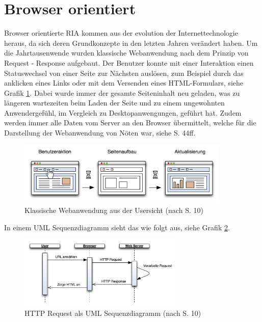  \section{Browser orientiert}
  
  Browser orientierte \ac{RIA} kommen aus der evolution der Internettechnologie
  heraus, da sich deren Grundkonzepte in den letzten Jahren verändert haben. Um
  die Jahrtausenwende wurden klassische Webanwendung nach dem Prinzip von
  Request - Response aufgebaut. Der Benutzer konnte mit einer Interaktion einen
  Statuswechsel von einer Seite zur Nächsten auslösen, zum Beispiel durch das
  anklicken eines Links oder mit dem Versenden eines HTML-Formulars, siehe
  Grafik \ref{img:classicPageReload}. Dabei wurde immer der gesamte
  Seiteninhalt neu geladen, was zu längeren wartezeiten beim Laden der Seite
  und zu einem ungewohnten Anwendergefühl, im Vergleich zu Desktopanwengungen,
  geführt hat. Zudem werden immer alle Daten vom Server an den Browser
  übermittelt, welche für die Darstellung der Webanwendung von Nöten war, siehe
  \cite{AjaxInAction} S. 44ff.
  
  \begin{figure}[hbt]
    \begin{center}
      \includegraphics[width=0.9\textwidth]{./image/classicPageReload.png}
      \caption{Klassische Webanwendung aus der Usersicht (nach
      \cite{DiplomarbeitStephanSchuster} S. 10)}
      \label{img:classicPageReload}
    \end{center}
  \end{figure}
  
  In einem \ac{UML} Sequenzdiagramm sieht das wie folgt aus, siehe Grafik
  \ref{img:sequenzdiagrammClassicPageReload}.
  
  \begin{figure}[hbt]
    \begin{center}
      \includegraphics[width=0.7\textwidth]{./image/sequenzdiagrammClassicPageReload.png}
      \caption{HTTP Request als \ac{UML} Sequenzdiagramm (nach
      \cite{HttpBasics} S. 10)}
      \label{img:sequenzdiagrammClassicPageReload}
    \end{center}
  \end{figure}
  
